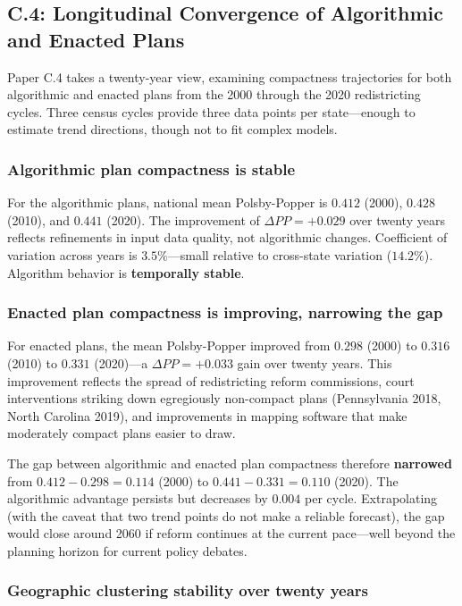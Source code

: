 \subsection{C.4: Longitudinal Convergence of Algorithmic and Enacted Plans}

Paper C.4 \citep{dellalibera2026c4} takes a twenty-year view, examining
compactness trajectories for both algorithmic and enacted plans from
the 2000 through the 2020 redistricting cycles. Three census cycles
provide three data points per state---enough to estimate trend
directions, though not to fit complex models.

\subsubsection{Algorithmic plan compactness is stable}

For the algorithmic plans, national mean Polsby-Popper is $0.412$
(2000), $0.428$ (2010), and $0.441$ (2020). The improvement of
$\Delta PP = +0.029$ over twenty years reflects refinements in input
data quality, not algorithmic changes. Coefficient of variation across
years is $3.5\%$---small relative to cross-state variation ($14.2\%$).
Algorithm behavior is \textbf{temporally stable}.

\subsubsection{Enacted plan compactness is improving, narrowing the gap}

For enacted plans, the mean Polsby-Popper improved from $0.298$ (2000)
to $0.316$ (2010) to $0.331$ (2020)---a $\Delta PP = +0.033$ gain
over twenty years. This improvement reflects the spread of redistricting
reform commissions, court interventions striking down egregiously
non-compact plans (Pennsylvania 2018, North Carolina 2019), and
improvements in mapping software that make moderately compact plans
easier to draw.

The gap between algorithmic and enacted plan compactness therefore
\textbf{narrowed} from $0.412 - 0.298 = 0.114$ (2000) to
$0.441 - 0.331 = 0.110$ (2020). The algorithmic advantage persists
but decreases by $0.004$ per cycle. Extrapolating (with the caveat
that two trend points do not make a reliable forecast), the gap would
close around 2060 if reform continues at the current pace---well beyond
the planning horizon for current policy debates.

\subsubsection{Geographic clustering stability over twenty years}

